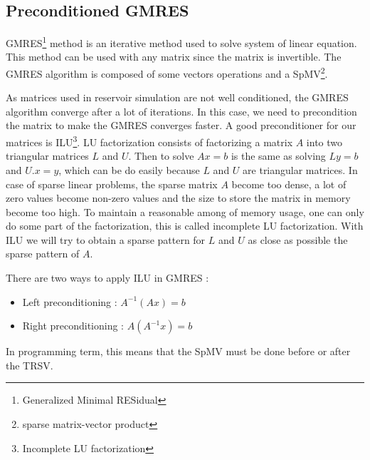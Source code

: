 \subsection{Preconditioned GMRES}
GMRES\footnote{Generalized Minimal RESidual} method is an iterative method used to solve system of linear equation.
%
This method can be used with any matrix since the matrix is invertible.
%
The GMRES algorithm is composed of some vectors operations and a SpMV\footnote{sparse matrix-vector product}.

As matrices used in reservoir simulation are not well conditioned, the GMRES algorithm converge after a lot of iterations.
%
In this case, we need to precondition the matrix to make the GMRES converges faster.
%
A good preconditioner for our matrices is ILU\footnote{Incomplete LU factorization}.
%
LU factorization consists of factorizing a matrix $A$ into two triangular matrices $L$ and $U$.
%
Then to solve $Ax=b$ is the same as solving $Ly=b$ and $U.x=y$, which can be do easily because $L$ and $U$ are triangular matrices.
%
In case of sparse linear problems, the sparse matrix $A$ become too dense, a lot of zero values become non-zero values and the size to store the matrix in memory become too high.
%
To maintain a reasonable among of memory usage, one can only do some part of the factorization, this is called incomplete LU factorization.
%
With ILU we will try to obtain a sparse pattern for $L$ and $U$ as close as possible the sparse pattern of $A$.

There are two ways to apply ILU in GMRES :
\begin{itemize}
  \item Left preconditioning : $A^{-1}(Ax)=b$
  \item Right preconditioning : $A(A^{-1}x)=b$
\end{itemize}

In programming term, this means that the SpMV must be done before or after the TRSV.
